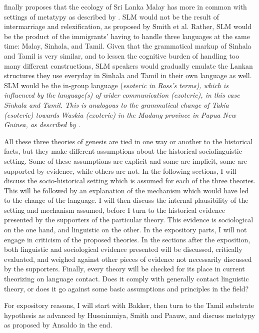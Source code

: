 \citet{Ansaldo2005ms,Ansaldo2008genesis,Ansaldo2009book} finally proposes that the ecology of Sri Lanka Malay has more in common with settings of metatypy as described by \citet{Ross1996,Ross1997,Ross2007}. SLM would not be the result of intermarriage and  relexification, as proposed by Smith et al. Rather, SLM would be the product of the immigrants' having to handle three languages at the same time: Malay, Sinhala, and Tamil. Given that the grammatical markup of Sinhala and Tamil is very similar, and to lessen the cognitive burden of handling too many different constructions, SLM speakers would gradually emulate the Lankan structures they use everyday in Sinhala and Tamil in their own language as well. SLM would be the in-group language (\em esoteric \em in Ross's terms), which is influenced by the language(s) of wider communication (\em exoteric\em), in this case Sinhala and Tamil. This is analogous to the grammatical change of Takia (\em esoteric\em) towards Waskia (\em exoteric\em) in the Madang province in Papua New Guinea, as described by \citet{Ross1996}.

All these three theories of genesis are tied in one way or another to the historical facts, but they make different assumptions about the historical sociolinguistic setting. Some of these assumptions are explicit and some are implicit, some are supported by evidence, while others are not. In the following sections, I will discuss the socio-historical setting which is assumed for each of the three theories. This will be followed by an explanation of the mechanism which would have led to the change of the language.  I will then discuss the internal plausibility of the setting and mechanism assumed, before I turn to the  historical evidence  presented by the supporters of the particular theory.  This evidence is sociological on the one hand, and linguistic on the other. In the expository parts, I will not engage in criticism of the proposed theories. In the sections after the exposition, both linguistic and sociological evidence presented will be  discussed, critically evaluated, and weighed against other pieces of evidence not necessarily discussed by the supporters. Finally, every theory will be checked for its place in current theorizing on language contact. Does it comply with generally contact linguistic theory, or does it go against some basic assumptions and principles in the field?

For expository reasons, I will start with Bakker,  then turn to the Tamil substrate hypothesis as advanced by Hussainmiya, Smith and Paauw, and discuss metatypy as proposed by Ansaldo in the end.


